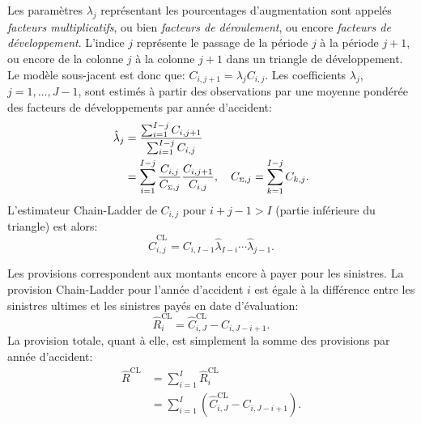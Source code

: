 Les paramètres $\lambda_j$ représentant les pourcentages
d'augmentation sont appelés \emph{facteurs multiplicatifs}, ou bien
\emph{facteurs de déroulement}, ou encore \emph{facteurs de
  développement}. L'indice $j$ représente le passage de la période $j$
à la période $j + 1$, ou encore de la colonne $j$ à la colonne $j+1$
dans un triangle de développement. Le modèle sous-jacent est donc que:
$C_{i, j+1} = \lambda_j C_{i, j}$. Les coefficients $\lambda_j$,
$j = 1, \dots, J - 1$, sont estimés à partir des observations par une
moyenne pondérée des facteurs de développements par année d'accident:
\begin{align*}
  \hat{\lambda}_j
  &= \frac{\sum_{i = 1}^{I - j} C_{i, j + 1}}{%
    \sum_{i = 1}^{I - j} C_{i, j}} \\
  &= \sum_{i = 1}^{I - j} \frac{C_{i, j}}{C_{\pt, j}}
    \frac{C_{i, j + 1}}{C_{i, j}}, \quad
    C_{\pt, j} = \sum_{k = 1}^{I - j} C_{k, j}.
\end{align*}
L'estimateur Chain-Ladder de $C_{i, j}$ pour $i + j - 1 > I$ (partie
inférieure du triangle) est alors:
\begin{equation*}
  \hat{C}_{i, j}^{\text{CL}}
  = C_{i, I - 1} \hat{\lambda}_{I - i} \cdots \hat{\lambda}_{j - 1}.
\end{equation*}

Les provisions correspondent aux montants encore à payer pour les
sinistres. La provision Chain-Ladder pour l'année d'accident $i$ est
égale à la différence entre les sinistres ultimes et les sinistres
payés en date d'évaluation:
\begin{equation*}
  \hat{R}_i^{\text{CL}} = \hat{C}_{i, J}^{\text{CL}} - C_{i, J - i + 1}.
\end{equation*}
La provision totale, quant à elle, est simplement la somme des
provisions par année d'accident:
\begin{align*}
  \hat{R}^{\text{CL}}
  &= \sum_{i = 1}^I \hat{R}_i^{\text{CL}} \\
  &= \sum_{i = 1}^I (\hat{C}_{i, J}^{\text{CL}} - C_{i, J - i + 1}).
\end{align*}

